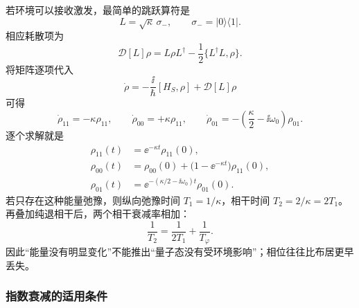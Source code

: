 若环境可以接收激发，最简单的跳跃算符是
\[
 L=\sqrt{\kappa}\,\sigma_- ,
 \qquad
 \sigma_-=\lvert0\rangle\langle1\rvert.
\]
相应耗散项为
\begin{equation}
 \mathcal D[L]\rho
 =L\rho L^\dagger-\frac12\{L^\dagger L,\rho\}.
 \label{eq:phys-oqs-elementary-amplitude-damping-dissipator}
\end{equation}
将矩阵逐项代入
\[
 \dot\rho=-\frac{\ii}{\hbar}[H_S,\rho]+\mathcal D[L]\rho
\]
可得
\[
 \dot\rho_{11}=-\kappa\rho_{11},
 \qquad
 \dot\rho_{00}=+\kappa\rho_{11},
 \qquad
 \dot\rho_{01}=-\left(\frac\kappa2-\ii\omega_0\right)\rho_{01}.
\]
逐个求解就是
\begin{equation}
 \begin{aligned}
 \rho_{11}(t)&=\ee^{-\kappa t}\rho_{11}(0),\\
 \rho_{00}(t)&=\rho_{00}(0)+\bigl(1-\ee^{-\kappa t}\bigr)\rho_{11}(0),\\
 \rho_{01}(t)&=\ee^{-(\kappa/2-\ii\omega_0)t}\rho_{01}(0).
 \end{aligned}
 \label{eq:phys-oqs-elementary-amplitude-damping-solution}
\end{equation}
若只存在这种能量弛豫，则纵向弛豫时间 \(T_1=1/\kappa\)，相干时间 \(T_2=2/\kappa=2T_1\)。再叠加纯退相干后，两个相干衰减率相加：
\begin{equation}
 \frac1{T_2}=\frac1{2T_1}+\frac1{T_\varphi}.
 \label{eq:phys-oqs-t1-t2-relation}
\end{equation}
因此“能量没有明显变化”不能推出“量子态没有受环境影响”；相位往往比布居更早丢失。

\subsubsection{指数衰减的适用条件}


